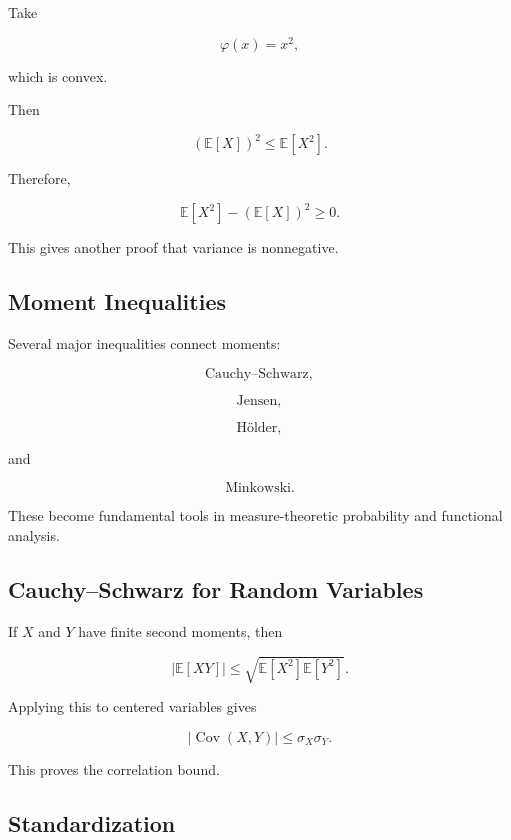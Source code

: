 Take

\[
\varphi(x)=x^2,
\]

which is convex.

Then

\[
(\mathbb{E}[X])^2
\leq
\mathbb{E}[X^2].
\]

Therefore,

\[
\boxed{
\mathbb{E}[X^2]
-
(\mathbb{E}[X])^2
\geq0.
}
\]

This gives another proof that variance is nonnegative.

\subsection{Moment Inequalities}
\label{subsec:moment-inequalities-preview}

Several major inequalities connect moments:

\[
\boxed{
\text{Cauchy--Schwarz},
}
\]

\[
\boxed{
\text{Jensen},
}
\]

\[
\boxed{
\text{Hölder},
}
\]

and

\[
\boxed{
\text{Minkowski}.
}
\]

These become fundamental tools in measure-theoretic probability and
functional analysis.

\subsection{Cauchy--Schwarz for Random Variables}
\label{subsec:cauchy-schwarz-rv}

If \(X\) and \(Y\) have finite second moments, then

\[
\boxed{
|\mathbb{E}[XY]|
\leq
\sqrt{
\mathbb{E}[X^2]
\mathbb{E}[Y^2]
}.
}
\]

Applying this to centered variables gives

\[
\boxed{
|\operatorname{Cov}(X,Y)|
\leq
\sigma_X\sigma_Y.
}
\]

This proves the correlation bound.

\subsection{Standardization}
\label{subsec:standardization-expectation}

